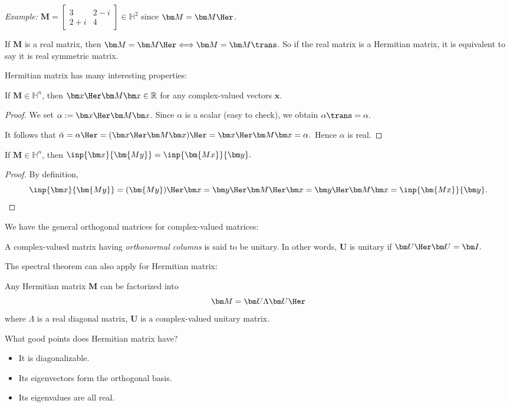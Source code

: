 \emph{Example: }$\bm M=\begin{bmatrix}
3&2-i\\2+i&4
\end{bmatrix}\in\mathbb{H}^2$ since $\bm M=\bm M\Her$.

If $\bm M$ is a real matrix, then $\bm M=\bm M\Her\Longleftrightarrow\bm M=\bm M\trans$. So if the real matrix is a Hermitian matrix, it is equivalent to say it is real symmetric matrix.

Hermitian matrix has many interesting properties:
\begin{proposition}
If $\bm M\in\mathbb{H}^n$, then $\bm x\Her\bm M\bm x\in\mathbb{R}$ for any complex-valued vectors $\bm x$.
\end{proposition}
\begin{proof}
We set $\alpha:=\bm x\Her\bm M\bm x$. Since $\alpha$ is a scalar (easy to check), we obtain $\alpha\trans=\alpha.$

It follows that $\bar\alpha=\alpha\Her=(\bm x\Her\bm M\bm x)\Her=\bm x\Her\bm M\bm x=\alpha.$ Hence $\alpha$ is real.
\end{proof}
\begin{proposition}
If $\bm M\in\mathbb{H}^n$, then $\inp{\bm x}{\bm{My}}=\inp{\bm{Mx}}{\bm y}.$
\end{proposition}
\begin{proof}
By definition,
\[
\inp{\bm x}{\bm{My}}=(\bm{My})\Her\bm x=\bm y\Her\bm M\Her\bm x=\bm y\Her\bm M\bm x=\inp{\bm{Mx}}{\bm y}.
\]
\end{proof}
We have the general orthogonal matrices for complex-valued matrices:
\begin{definition}[Unitary]
A complex-valued matrix having \emph{orthonormal columns} is said to be unitary. In other words, $\bm U$ is unitary if $\bm U\Her\bm U=\bm I.$
\end{definition}
The spectral theorem can also apply for Hermitian matrix:
\begin{theorem}
Any Hermitian matrix $\bm M$ can be factorized into
\[
\bm M=\bm U\Lambda\bm U\Her
\]
where $\Lambda$ is a real diagonal matrix, $\bm U$ is a complex-valued unitary matrix.
\end{theorem}
\begin{remark}
What good points does Hermitian matrix have?
\begin{itemize}
\item
It is diagonalizable.
\item
Its eigenvectors form the orthogonal basis.
\item
Its eigenvalues are all real.
\end{itemize}
\end{remark}